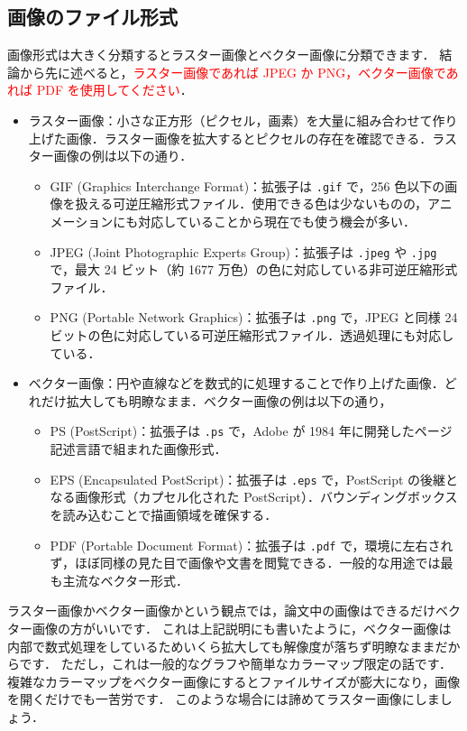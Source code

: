 \clearpage
\subsection{画像のファイル形式}
\label{ssec:figure_format}

画像形式は大きく分類するとラスター画像とベクター画像に分類できます．
結論から先に述べると，\textcolor{red}{ラスター画像であれば JPEG か PNG，ベクター画像であれば PDF を使用してください}．

\begin{itemize}
    \item ラスター画像：小さな正方形（ピクセル，画素）を大量に組み合わせて作り上げた画像．ラスター画像を拡大するとピクセルの存在を確認できる．ラスター画像の例は以下の通り．
    \begin{itemize}
        \item GIF (Graphics Interchange Format)：拡張子は \verb|.gif| で，256 色以下の画像を扱える可逆圧縮形式ファイル．使用できる色は少ないものの，アニメーションにも対応していることから現在でも使う機会が多い．
        \item JPEG (Joint Photographic Experts Group)：拡張子は \verb|.jpeg| や \verb|.jpg| で，最大 24 ビット（約 1677 万色）の色に対応している非可逆圧縮形式ファイル．
        \item PNG (Portable Network Graphics)：拡張子は \verb|.png| で，JPEG と同様 24 ビットの色に対応している可逆圧縮形式ファイル．透過処理にも対応している．
    \end{itemize}
    \item ベクター画像：円や直線などを数式的に処理することで作り上げた画像．どれだけ拡大しても明瞭なまま．ベクター画像の例は以下の通り，
    \begin{itemize}
        \item PS (PostScript)：拡張子は \verb|.ps| で，Adobe が 1984 年に開発したページ記述言語で組まれた画像形式．
        \item EPS (Encapsulated PostScript)：拡張子は \verb|.eps| で，PostScript の後継となる画像形式（カプセル化された PostScript）．バウンディングボックスを読み込むことで描画領域を確保する．
        \item PDF (Portable Document Format)：拡張子は \verb|.pdf| で，環境に左右されず，ほぼ同様の見た目で画像や文書を閲覧できる．一般的な用途では最も主流なベクター形式．
    \end{itemize}
\end{itemize}

ラスター画像かベクター画像かという観点では，論文中の画像はできるだけベクター画像の方がいいです．
これは上記説明にも書いたように，ベクター画像は内部で数式処理をしているためいくら拡大しても解像度が落ちず明瞭なままだからです．
ただし，これは一般的なグラフや簡単なカラーマップ限定の話です．
複雑なカラーマップをベクター画像にするとファイルサイズが膨大になり，画像を開くだけでも一苦労です．
このような場合には諦めてラスター画像にしましょう．

